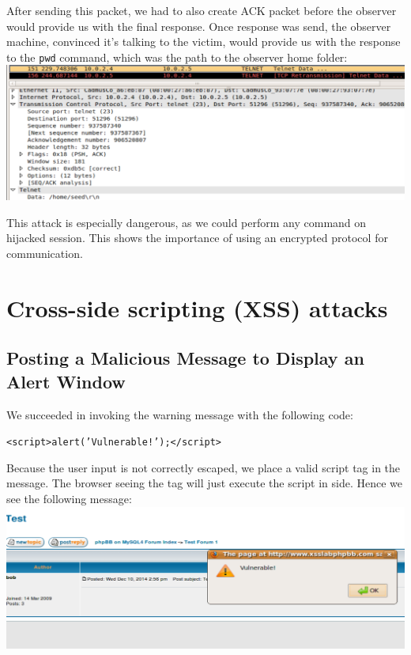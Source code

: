 \documentclass[12pt, a4paper]{article}
\begin{document}
After sending this packet, we had to also create ACK packet before the observer would provide us with the final response. Once response was send, the observer machine, convinced it's talking to the victim, would provide us with the response to the \texttt{pwd} command, which was the path to the observer home folder:\\

\includegraphics[width=.95\textwidth]{gfx/response.png}

This attack is especially dangerous, as we could perform any command on hijacked session. This shows the importance of using an encrypted protocol for communication.

\section{Cross-side scripting (XSS) attacks}

\subsection{Posting a Malicious Message to Display an Alert Window}
We succeeded in invoking the warning message with the following code:\\
\begin{center}\texttt{<script>alert('Vulnerable!');</script>}\end{center}
Because the user input is not correctly escaped, we place a valid script tag in the message. The browser seeing the tag will just execute the script in side. Hence we see the following message:\\
\includegraphics[width=.95\textwidth]{gfx/xss/task1.png}
\end{document}
